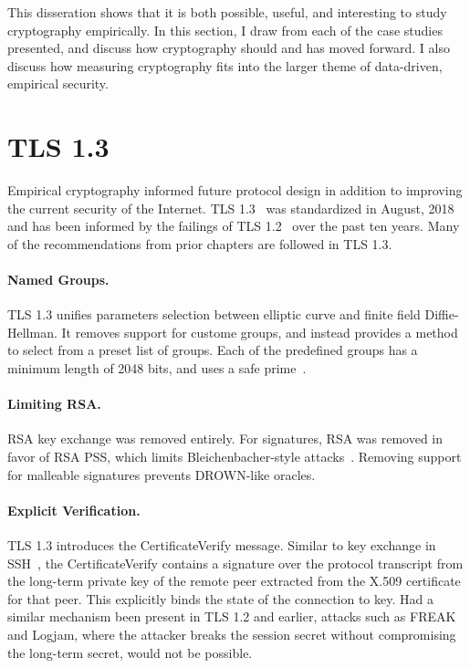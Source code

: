 This disseration shows that it is both possible, useful, and interesting to
study cryptography empirically. In this section, I draw from each of the case
studies presented, and discuss how cryptography should and has moved
forward. I also discuss how measuring cryptography fits into the larger theme
of data-driven, empirical security.

\section{TLS 1.3}

Empirical cryptography informed future protocol design in addition to
improving the current security of the Internet. TLS 1.3~\cite{rfc8446} was
standardized in August, 2018 and has been informed by the failings of TLS
1.2~\cite{tls-ietf-inria-bug,tls-ietf-smacktls,tls-ietf-rsa-pss} over the
past ten years. Many of the recommendations from prior chapters are followed
in TLS 1.3.

\paragraph{Named Groups.}
TLS 1.3 unifies parameters selection between elliptic curve and finite field
Diffie-Hellman. It removes support for custome \dhe{} groups, and instead
provides a method to select from a preset list of groups. Each of the
predefined groups has a minimum length of 2048 bits, and uses a safe
prime~\cite{rfc7919}.

\paragraph{Limiting RSA.}
RSA key exchange was removed entirely. For signatures, RSA \PKCS was removed
in favor of RSA PSS, which limits Bleichenbacher-style
attacks~\cite{exact-security-rsa}. Removing support for malleable \PKCS
signatures prevents DROWN-like oracles.

\paragraph{Explicit Verification.}
TLS 1.3 introduces the \textsf{CertificateVerify} message. Similar to key
exchange in SSH~\cite{rfc4253}, the \textsf{CertificateVerify} contains a
signature over the protocol transcript from the long-term private key of the
remote peer extracted from the X.509 certificate for that peer. This
explicitly binds the state of the connection to key. Had a similar mechanism
been present in TLS 1.2 and earlier, attacks such as FREAK and Logjam, where
the attacker breaks the session secret without compromising the long-term
secret, would not be possible.

